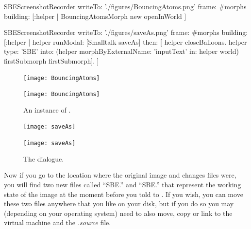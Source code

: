 \documentclass[a4paper,10pt,twoside]{book}
\begin{document}

\begin{ExecuteSmalltalkScript}
SBEScreenshotRecorder writeTo: './figures/BouncingAtoms.png' frame: #morphs building: [:helper |
  BouncingAtomsMorph new openInWorld
]
\end{ExecuteSmalltalkScript}

\begin{ExecuteSmalltalkScript}
SBEScreenshotRecorder writeTo: './figures/saveAs.png' frame: #morphs building: [:helper |
  helper
    runModal: [Smalltalk saveAs]
    then: [
      helper closeBalloons.
      helper type: 'SBE' into: (helper morphByExternalName: 'inputText' in: helper world) firstSubmorph firstSubmorph].
]
\end{ExecuteSmalltalkScript}

\begin{figure}[htb]
\begin{minipage}[b]{.48\textwidth}
\ifluluelse
	{\centerline {\texttt{[image: BouncingAtoms]}}}
	{\centerline {\texttt{[image: BouncingAtoms]}}}
	\caption{An instance of .
	\label{fig:bouncingAtoms}}
\end{minipage}
\hfill
\begin{minipage}[b]{.48\textwidth}
\ifluluelse
	{\centerline{\texttt{[image: saveAs]}}}
	{\centerline{\texttt{[image: saveAs]}}}
	\caption{The  dialogue.
	\label{fig:saveas}}
\end{minipage}
\end{figure}


Now if you go to the location where the original image and changes files were, you will find two new files called ``SBE.'' and ``SBE.'' that represent the working state of the \sq image at the moment before you told \sq to .
If you wish, you can move these two files anywhere that you like on your disk, but if you do so you may (depending on your operating system) need to also move, copy or link to the virtual machine and the \emph{.source} file.
\end{document}
